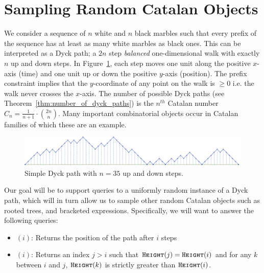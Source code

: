 \section{Sampling Random Catalan Objects}%
\label{sec:catalan_objects}

We consider a sequence of $n$ white and $n$ black marbles such that every prefix of the sequence has at least as many white marbles as black ones.
This can be interpreted as a Dyck path; a $2n$ step \emph{balanced} one-dimensional walk with exactly $n$ up and down steps.
In Figure~\ref{fig:basic_dyck}, each step moves one unit along the positive $x$-axis (time) and one unit up or down the positive $y$-axis (position).
The prefix constraint implies that the $y$-coordinate of any point on the walk is $\ge 0$ i.e. the walk never crosses the $x$-axis.
The number of possible Dyck paths (see Theorem~\ref{thm:number_of_dyck_paths}) is the $n^{th}$ Catalan number $C_n=\frac{1}{n+1}\cdot{2n\choose n}$.
Many important combinatorial objects occur in Catalan families of which these are an example.
\begin{figure}[htbp]
    \centering
    \includegraphics[width=\textwidth]{images/basic_dyck_path.pdf}
    \caption{Simple Dyck path with $n = 35$ up and down steps.}
    \label{fig:basic_dyck}
\end{figure}

Our goal will be to support queries to a uniformly random instance of a Dyck path,
which will in turn allow us to sample other random Catalan objects such as rooted trees, and bracketed expressions.
Specifically, we will want to answer the following queries:
\begin{itemize}
    \item {}$(i)$: Returns the position of the path after $i$ steps
    \item {}$(i)$: Returns an index $j>i$ such that $\texttt{\textsc{Height}}(j)=\texttt{\textsc{Height}}(i)$ and for any $k$ between $i$ and $j$,
    $\texttt{\textsc{Height}}(k)$ is strictly greater than $\texttt{\textsc{Height}}(i)$.
\end{itemize}



